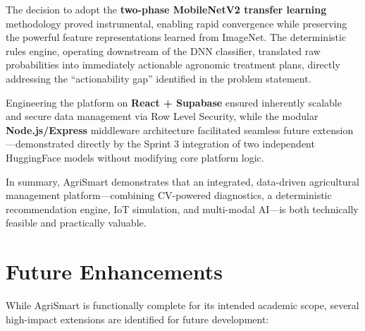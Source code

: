 \documentclass[12pt,a4paper]{report}
\begin{document}
The decision to adopt the \textbf{two-phase MobileNetV2 transfer learning} methodology proved instrumental, enabling rapid convergence while preserving the powerful feature representations learned from ImageNet. The deterministic rules engine, operating downstream of the DNN classifier, translated raw probabilities into immediately actionable agronomic treatment plans, directly addressing the ``actionability gap'' identified in the problem statement.

Engineering the platform on \textbf{React + Supabase} ensured inherently scalable and secure data management via Row Level Security, while the modular \textbf{Node.js/Express} middleware architecture facilitated seamless future extension---demonstrated directly by the Sprint 3 integration of two independent HuggingFace models without modifying core platform logic.

In summary, AgriSmart demonstrates that an integrated, data-driven agricultural management platform---combining CV-powered diagnostics, a deterministic recommendation engine, IoT simulation, and multi-modal AI---is both technically feasible and practically valuable.

\section{Future Enhancements}
While AgriSmart is functionally complete for its intended academic scope, several high-impact extensions are identified for future development:
\end{document}
